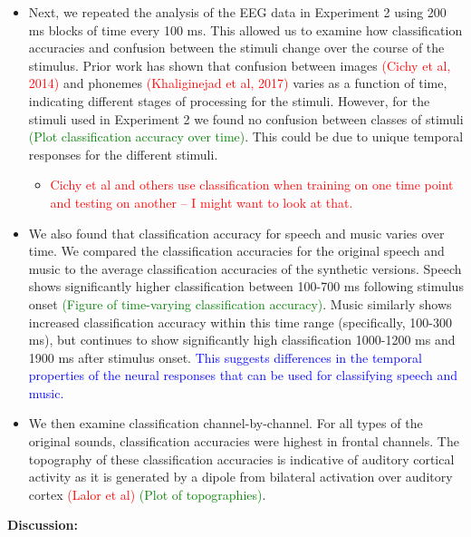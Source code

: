 \documentclass[11pt]{article}
\begin{document}
\begin{itemize}
\item Next, we repeated the analysis of the EEG data in Experiment 2 using 200 ms blocks of time every 100 ms.  This allowed us to examine how classification accuracies and confusion between the stimuli change over the course of the stimulus.  Prior work has shown that confusion between images \textcolor{red}{(Cichy et al, 2014)} and phonemes \textcolor{red}{(Khaliginejad et al, 2017)} varies as a function of time, indicating different stages of processing for the stimuli.  However, for the stimuli used in Experiment 2 we found no confusion between classes of stimuli \textcolor{green}{(Plot classification accuracy over time)}.  This could be due to unique temporal responses for the different stimuli.
    \begin{itemize}
    \item \textcolor{red}{Cichy et al and others use classification when training on one time point and testing on another -- I might want to look at that.}
    \end{itemize}
\item We also found that classification accuracy for speech and music varies over time.  We compared the classification accuracies for the original speech and music to the average classification accuracies of the synthetic versions.  Speech shows significantly higher classification between 100-700 ms following stimulus onset \textcolor{green}{(Figure of time-varying classification accuracy)}.  Music similarly shows increased classification accuracy within this time range (specifically, 100-300 ms), but continues to show significantly high classification 1000-1200 ms and 1900 ms after stimulus onset.  \textcolor{blue}{This suggests differences in the temporal properties of the neural responses that can be used for classifying speech and music.}
\item We then examine classification channel-by-channel.  For all types of the original sounds, classification accuracies were highest in frontal channels.  The topography of these classification accuracies is indicative of auditory cortical activity as it is generated by a dipole from bilateral activation over auditory cortex \textcolor{red}{(Lalor et al)} \textcolor{green}{(Plot of topographies)}.
\end{itemize}

\textbf{Discussion:}
\end{document}
